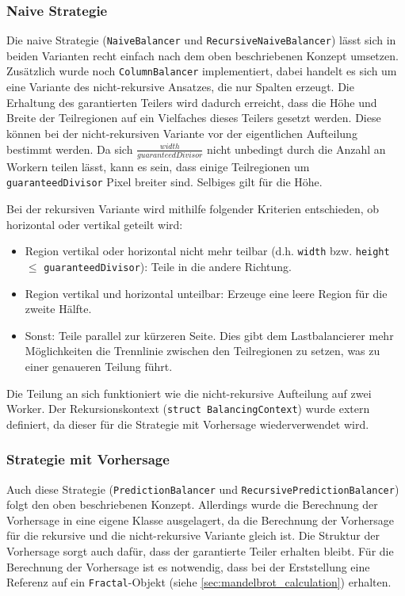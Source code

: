 \subsubsection{Naive Strategie}

Die naive Strategie (\verb|NaiveBalancer| und \verb|RecursiveNaiveBalancer|) lässt sich in beiden Varianten recht einfach nach dem oben beschriebenen Konzept umsetzen.
Zusätzlich wurde noch \verb|ColumnBalancer| implementiert, dabei handelt es sich um eine Variante des nicht-rekursive Ansatzes, die nur Spalten erzeugt.
Die Erhaltung des garantierten Teilers wird dadurch erreicht, dass die Höhe und Breite der Teilregionen auf ein Vielfaches dieses Teilers gesetzt werden.
Diese können bei der nicht-rekursiven Variante vor der eigentlichen Aufteilung bestimmt werden.
Da sich $\frac{width}{guaranteedDivisor}$ nicht unbedingt durch die Anzahl an Workern teilen lässt, kann es sein, dass einige Teilregionen um \verb|guaranteedDivisor| Pixel breiter sind.
Selbiges gilt für die Höhe.

Bei der rekursiven Variante wird mithilfe folgender Kriterien entschieden, ob horizontal oder vertikal geteilt wird:

\begin{itemize}
	\item Region vertikal oder horizontal nicht mehr teilbar (d.h. \verb|width| bzw. \verb|height| $\leq$ \verb|guaranteedDivisor|): Teile in die andere Richtung.
	\item Region vertikal und horizontal unteilbar: Erzeuge eine leere Region für die zweite Hälfte.
	\item Sonst: Teile parallel zur kürzeren Seite. Dies gibt dem Lastbalancierer mehr Möglichkeiten die Trennlinie zwischen den Teilregionen zu setzen, was zu einer genaueren Teilung führt.
\end{itemize}

Die Teilung an sich funktioniert wie die nicht-rekursive Aufteilung auf zwei Worker.
Der Rekursionskontext (\verb|struct BalancingContext|) wurde extern definiert, da dieser für die Strategie mit Vorhersage wiederverwendet wird.

\subsubsection{Strategie mit Vorhersage}

Auch diese Strategie (\verb|PredictionBalancer| und \verb|RecursivePredictionBalancer|) folgt den oben beschriebenen Konzept.
Allerdings wurde die Berechnung der Vorhersage in eine eigene Klasse ausgelagert, da die Berechnung der Vorhersage für die rekursive und die nicht-rekursive Variante gleich ist.
Die Struktur der Vorhersage sorgt auch dafür, dass der garantierte Teiler erhalten bleibt.
Für die Berechnung der Vorhersage ist es notwendig, dass bei der Erststellung eine Referenz auf ein \verb|Fractal|-Objekt (siehe \ref{sec:mandelbrot_calculation}) erhalten.

